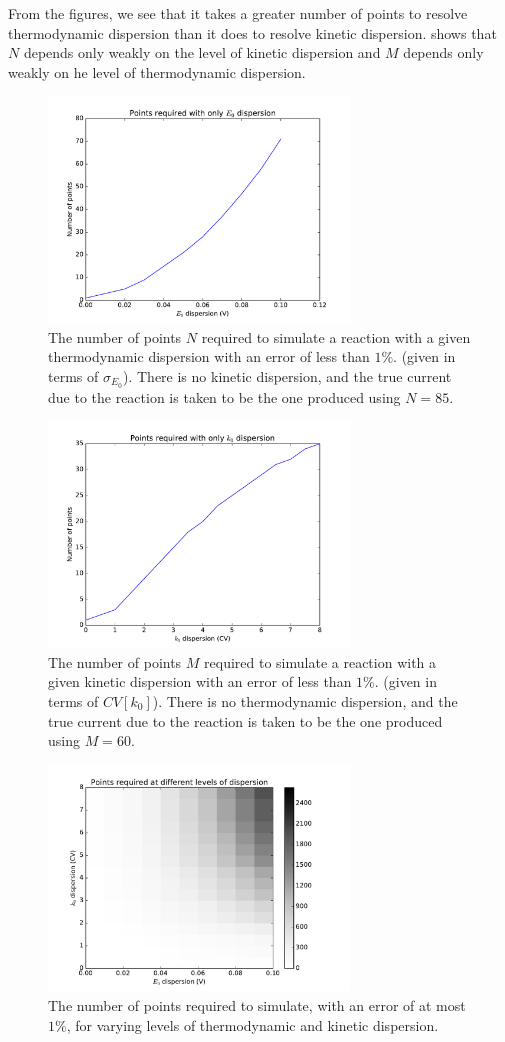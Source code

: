 \documentclass[twocolumn]{article}
\begin{document}
	From the figures, we see that it takes a greater number of points to resolve thermodynamic dispersion than it does to resolve kinetic dispersion.   shows that $N$ depends only weakly on the level of kinetic dispersion and $M$ depends only weakly on he level of thermodynamic dispersion.
	
	\begin{figure}[h]
		\centering
		\includegraphics[height=6cm]{E0DispPts.pdf}
		\caption{\label{fig:thermo-disp} The number of points $N$ required to simulate a reaction with a given thermodynamic dispersion with an error of less than $1\%$. (given in terms of $\sigma_{E_0}$).  There is no kinetic dispersion, and the true current due to the reaction is taken to be the one produced using $N = 85$.}
	\end{figure}
		
	\begin{figure}[h]
		\centering
		\includegraphics[height=6cm]{k0DispPts.pdf}
		\caption{\label{fig:kin-disp} The number of points $M$ required to simulate a reaction with a given kinetic dispersion with an error of less than $1\%$. (given in terms of $CV[k_0]$).  There is no thermodynamic dispersion, and the true current due to the reaction is taken to be the one produced using $M = 60$.}
	\end{figure}
		
	\begin{figure}[h]
		\centering
		\includegraphics[height=6cm]{bothDispPts.pdf}
		\caption{\label{fig:both-disp} The number of points required to simulate, with an error of at most $1\%$, for varying levels of thermodynamic and kinetic dispersion.}
	\end{figure}
	
\end{document}
